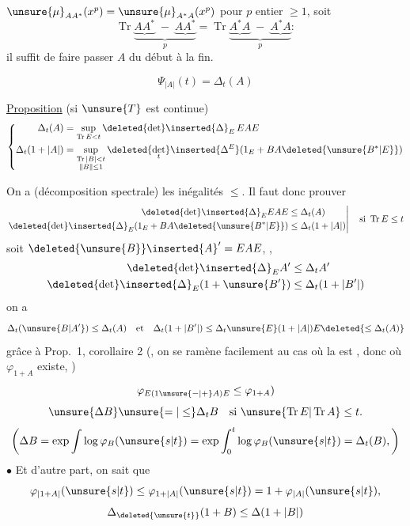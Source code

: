 $\unsure{\mu}_{AA^*}(x^p)=\unsure{\mu}_{A^*A}(x^p)$ pour $p$ entier $\geq1$, soit
\[
\operatorname{Tr}\underbrace{\underbrace{AA^*}\; - \;\underbrace{AA^*}}_{p}
=\operatorname{Tr}\underbrace{\underbrace{A^*A}\; - \;\underbrace{A^*A}}_{p}:
\]
il suffit de faire passer $A$ du début à la fin.

\[
\Psi_{|A|}(t)=\Delta_t(A)
\]

\uline{Proposition} (si $\unsure{T}$ est continue)
\[
\left\{\begin{aligned}
\Delta_t(A)&=\sup_{\operatorname{Tr}E<t}\deleted{\det}\inserted{\Delta}_E\,EAE\\
\Delta_t(1+|A|)&=\sup_{\substack{\operatorname{Tr}|B|<t\\\|B\|\leq1}}
\deleted{\det_t}\inserted{\Delta^E}(1_E+BA\deleted{\unsure{B^*|E}})
\end{aligned}\right.
\]

On a (décomposition spectrale) les inégalités $\leq$. Il faut donc prouver
\[
\left.\begin{aligned}
\deleted{\det}\inserted{\Delta}_E EAE&\leq\Delta_t(A)\\
\deleted{\det}\inserted{\Delta}_E(1_E+BA\deleted{\unsure{B^*|E}})&\leq\Delta_t(1+|A|)
\end{aligned}\right|\quad\text{si }\operatorname{Tr}E\leq t
\]
soit $\deleted{\unsure{B}}\inserted{A}'=EAE$,
, \uline{} 
\[
\begin{aligned}
\deleted{\det}\inserted{\Delta}_E A'&\leq\Delta_t A'\\
\deleted{\det}\inserted{\Delta}_E(1+\unsure{B'})&\leq\Delta_t(1+|B'|)
\end{aligned}
\]
on a
\[
\Delta_t(\unsure{B|A'})\leq\Delta_t(A)
\quad\text{et}\quad
\Delta_t(1+|B'|)\leq\Delta_t\unsure{E}(1+|A|)E\deleted{\leq\Delta_t(A)}
\]
grâce à Prop.\ 1, corollaire 2 (, on se ramène facilement au cas où la  est , donc où $\varphi_{1+A}$ existe, )
\[
\varphi_{E(1\unsure{-|+}A)E}\leq\varphi_{1+A})
\]
\deleted{$\det$}
\[
\unsure{\Delta B}\unsure{=|\leq}\Delta_tB
\quad\text{si }\unsure{\operatorname{Tr}E|\operatorname{Tr}A}\leq t.
\]
\[
\left(\Delta B=\exp\int\log\varphi_B(\unsure{s|t})
=\exp\int_0^t\log\varphi_B(\unsure{s|t})=\Delta_t(B),\right)
\]
\noindent$\bullet$ Et d'autre part, on sait que
\[
\varphi_{|1+A|}(\unsure{s|t})\leq\varphi_{1+|A|}(\unsure{s|t})
=1+\varphi_{|A|}(\unsure{s|t}),
\]
\[
\Delta_{\deleted{\unsure{t}}}(1+B)\leq\Delta(1+|B|)
\]
